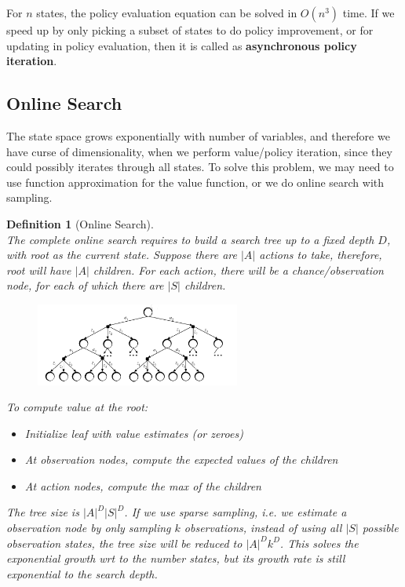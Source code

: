 \documentclass[12pt]{article}
\newtheorem{definition}{Definition}[section]
\theoremstyle{definition}
\begin{document}
For $n$ states, the policy evaluation equation can be solved in $O(n^3)$ time. If we speed up by only picking a subset of states to do policy improvement, or for updating in policy evaluation, then it is called as \textbf{asynchronous policy iteration}.
\subsection{Online Search}
The state space grows exponentially with number of variables, and therefore we have curse of dimensionality, when we perform value/policy iteration, since they could possibly iterates through all states. To solve this problem, we may need to use function approximation for the value function, or we do online search with sampling.
\begin{definition}[Online Search]
\hfill\\\normalfont The complete online search requires to build a search tree up to a fixed depth $D$, with root as the current state. Suppose there are $|A|$ actions to take, therefore, root will have $|A|$ children. For each action, there will be a chance/observation node, for each of which there are $|S|$ children.
\begin{figure}[h]
\centering
\includegraphics[width=0.6\textwidth]{2.png}
\end{figure}
To compute value at the root:
\begin{itemize}
	\item Initialize leaf with value estimates (or zeroes)
	\item At observation nodes, compute the expected values of the children
	\item At action nodes, compute the max of the children
\end{itemize}
The tree size is $|A|^D|S|^D$. If we use sparse sampling, i.e. we estimate a observation node by only sampling $k$ observations, instead of using all $|S|$ possible observation states, the tree size will be reduced to $|A|^Dk^D$. This solves the exponential growth wrt to the number states, but its growth rate is still exponential to the search depth.
\end{definition}
\end{document}
